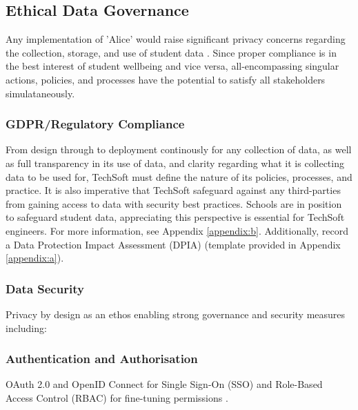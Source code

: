 \documentclass[14pt,a4paper]{article}
\begin{document}
\begin{multicols}{2}

\subsection{Ethical Data Governance}
Any implementation of 'Alice' would raise significant privacy concerns regarding the collection, storage, and use of student data \textit{\parencite[pp. 366-370]{Annus2023}}.
Since proper compliance is in the best interest of student wellbeing and vice versa, all-encompassing singular actions, policies, and processes have the potential to satisfy all stakeholders simulataneously.

\subsubsection{GDPR/Regulatory Compliance}
From design through to deployment continously for any collection of data, as well as full transparency in its use of data, and clarity regarding what it is collecting data to be used for, TechSoft must define the nature of its policies, processes, and practice. It is also imperative that TechSoft safeguard against any third-parties from gaining access to data with security best practices. Schools are in position to safeguard student data, appreciating this perspective is essential for TechSoft engineers. For more information, see Appendix \ref{appendix:b}. Additionally, record a Data Protection Impact Assessment (DPIA) (template provided in Appendix \ref{appendix:a}).

\subsubsection{Data Security}
Privacy by design as an ethos enabling strong governance and security measures including:

\subsubsection*{Authentication and Authorisation}
OAuth 2.0 and OpenID Connect for Single Sign-On (SSO) and Role-Based Access Control (RBAC) for fine-tuning permissions \textit{\parencite[pp. 80-120]{Josuttis2023}}.


\end{multicols}
\end{document}
